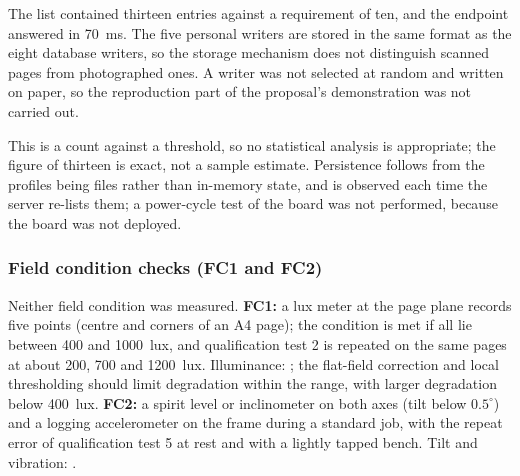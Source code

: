             The list contained thirteen entries against a requirement of ten, and the endpoint answered in 70~ms.
            The five personal writers are stored in the same format as the eight database writers, so the storage mechanism does not distinguish scanned pages from photographed ones.
            A writer was not selected at random and written on paper, so the reproduction part of the proposal's demonstration was not carried out.


            This is a count against a threshold, so no statistical analysis is appropriate; the figure of thirteen is exact, not a sample estimate.
            Persistence follows from the profiles being files rather than in-memory state, and is observed each time the server re-lists them; a power-cycle test of the board was not performed, because the board was not deployed.


\subsubsection*{Field condition checks (FC1 and FC2)}
\label{sec:res-fc}

Neither field condition was measured.
\textbf{FC1:} a lux meter at the page plane records five points (centre and corners of an A4 page); the condition is met if all lie between 400 and 1000~lux, and qualification test 2 is repeated on the same pages at about 200, 700 and 1200~lux.
Illuminance: \nym{}; the flat-field correction and local thresholding should limit degradation within the range, with larger degradation below 400~lux.
\textbf{FC2:} a spirit level or inclinometer on both axes (tilt below $0.5^\circ$) and a logging accelerometer on the frame during a standard job, with the repeat error of qualification test 5 at rest and with a lightly tapped bench.
Tilt and vibration: \nym{}.
